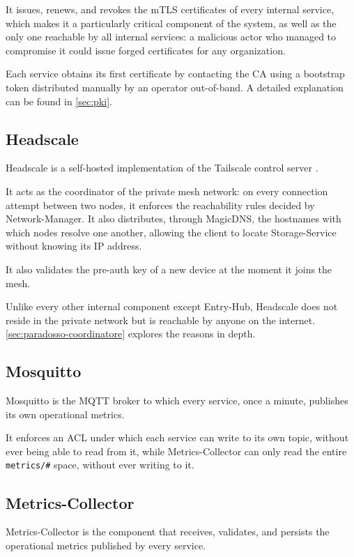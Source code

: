 It issues, renews, and revokes the mTLS certificates of every internal service, which makes it a
particularly critical component of the system, as well as the only one reachable by all internal services:
a malicious actor who managed to compromise it could issue forged certificates
for any organization.

Each service obtains its first certificate by contacting the CA using a bootstrap token distributed
manually by an operator out-of-band. A detailed explanation can be found in \autoref{sec:pki}.


\subsection{Headscale}

Headscale is a self-hosted implementation of the Tailscale control server \cite{headscale-github}.

It acts as the coordinator of the private mesh network: on every connection attempt between two nodes,
it enforces the reachability rules decided by Network-Manager. It also distributes, through
MagicDNS, the hostnames with which nodes resolve one another, allowing the client to locate
Storage-Service without knowing its IP address.

It also validates the pre-auth key of a new device at the moment it joins the mesh.

Unlike every other internal component except Entry-Hub, Headscale does not reside in the
private network but is reachable by anyone on the internet. \autoref{sec:paradosso-coordinatore} explores the reasons in depth.

\subsection{Mosquitto}

Mosquitto is the MQTT broker to which every service, once a minute, publishes its own operational metrics.

It enforces an ACL under which each service can write to its own topic, without ever being able to read from it,
while Metrics-Collector can only read the entire \texttt{metrics/\#} space, without ever writing to it.

\subsection{Metrics-Collector}

Metrics-Collector is the component that receives, validates, and persists the operational metrics
published by every service.

